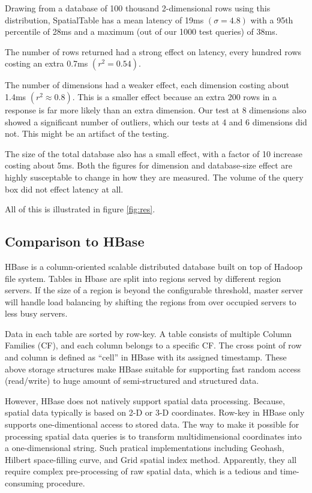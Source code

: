 \documentclass[11pt]{article}
\begin{document}
Drawing from a database of 100 thousand 2-dimensional rows using this distribution, SpatialTable has a mean latency of 19ms $(\sigma=4.8)$ with a 95th percentile of 28ms and a maximum (out of our 1000 test queries) of 38ms.

The number of rows returned had a strong effect on latency, every hundred rows costing an extra 0.7ms $(r^2=0.54)$.

The number of dimensions had a weaker effect, each dimension costing about 1.4ms $(r^2\approx 0.8)$.  This is a smaller effect because an extra 200 rows in a response is far more likely than an extra dimension.  Our test at 8 dimensions also showed a significant number of outliers, which our tests at 4 and 6 dimensions did not.   This might be an artifact of the testing.

The size of the total database also has a small effect, with a factor of 10 increase costing about 5ms.  Both the figures for dimension and database-size effect are highly susceptable to change in how they are measured.  The volume of the query box did not effect latency at all.

All of this is illustrated in figure \ref{fig:res}.

\subsection{Comparison to HBase}

HBase is a column-oriented scalable distributed database built on top of Hadoop file system. Tables in Hbase are split into regions served by different region servers. If the size of a region is beyond the configurable threshold, master server will handle load balancing by shifting the regions from over occupied servers to less busy servers. 

Data in each table are sorted by row-key. A table consists of multiple Column Families (CF), and each column belongs to a specific CF. The cross point of row and column is defined as ``cell''  in HBase with its assigned timestamp. These above storage structures make HBase suitable for supporting fast random access (read/write) to huge amount of semi-structured and structured data. 

However, HBase does not natively support spatial data processing. Because, spatial data typically is based on 2-D or 3-D coordinates. Row-key in HBase only supports one-dimentional access to stored data. The way to make it possible for processing spatial data queries is to transform multidimensional coordinates into a one-dimensional string. Such pratical implementations including Geohash,\cite{geohash} Hilbert space-filling curve,\cite{hilbert}  and Grid spatial index method.\cite{grid} Apparently, they all require complex pre-processing of raw spatial data, which is a tedious and time-consuming procedure. 
\end{document}
